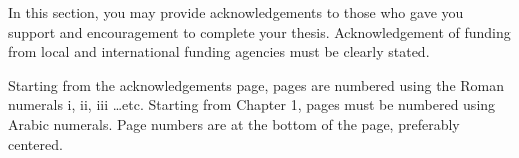 In this section, you may provide acknowledgements to those who gave you support and encouragement to complete your thesis. Acknowledgement of funding from local and international funding agencies must be clearly stated.

Starting from the acknowledgements page, pages are numbered using the Roman numerals i, ii, iii …etc. Starting from Chapter 1, pages must be numbered using Arabic numerals. Page numbers are at the bottom of the page, preferably centered.
